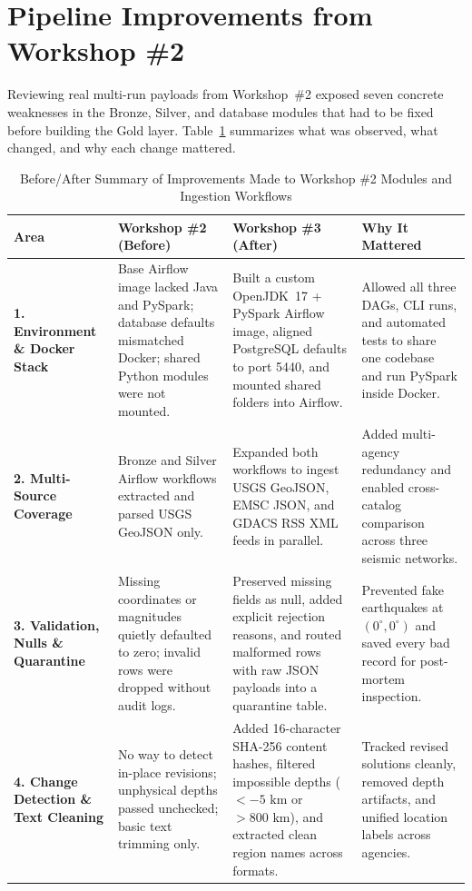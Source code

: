 \section{Pipeline Improvements from Workshop \#2}

Reviewing real multi-run payloads from Workshop~\#2 exposed seven concrete weaknesses in the Bronze, Silver, and database modules that had to be fixed before building the Gold layer. Table~\ref{tab:before_after} summarizes what was observed, what changed, and why each change mattered.

\begin{table}[!t]
\centering
\caption{Before/After Summary of Improvements Made to Workshop \#2 Modules and Ingestion Workflows}
\label{tab:before_after}
\footnotesize
\renewcommand{\arraystretch}{1.15}
\begin{tabularx}{\textwidth}{p{2.6cm} p{4.2cm} p{4.7cm} X}
\toprule
\textbf{Area} & \textbf{Workshop \#2 (Before)} & \textbf{Workshop \#3 (After)} & \textbf{Why It Mattered} \\
\midrule
\textbf{1. Environment \& Docker Stack} & Base Airflow image lacked Java and PySpark; database defaults mismatched Docker; shared Python modules were not mounted. & Built a custom OpenJDK~17 + PySpark Airflow image, aligned PostgreSQL defaults to port 5440, and mounted shared folders into Airflow. & Allowed all three DAGs, CLI runs, and automated tests to share one codebase and run PySpark inside Docker. \\
\textbf{2. Multi-Source Coverage} & Bronze and Silver Airflow workflows extracted and parsed USGS GeoJSON only. & Expanded both workflows to ingest USGS GeoJSON, EMSC JSON, and GDACS RSS XML feeds in parallel. & Added multi-agency redundancy and enabled cross-catalog comparison across three seismic networks. \\
\textbf{3. Validation, Nulls \& Quarantine} & Missing coordinates or magnitudes quietly defaulted to zero; invalid rows were dropped without audit logs. & Preserved missing fields as null, added explicit rejection reasons, and routed malformed rows with raw JSON payloads into a quarantine table. & Prevented fake earthquakes at $(0^\circ, 0^\circ)$ and saved every bad record for post-mortem inspection. \\
\textbf{4. Change Detection \& Text Cleaning} & No way to detect in-place revisions; unphysical depths passed unchecked; basic text trimming only. & Added 16-character SHA-256 content hashes, filtered impossible depths ($<-5\text{ km}$ or $>800\text{ km}$), and extracted clean region names across formats. & Tracked revised solutions cleanly, removed depth artifacts, and unified location labels across agencies. \\

\end{tabularx}
\end{table}
